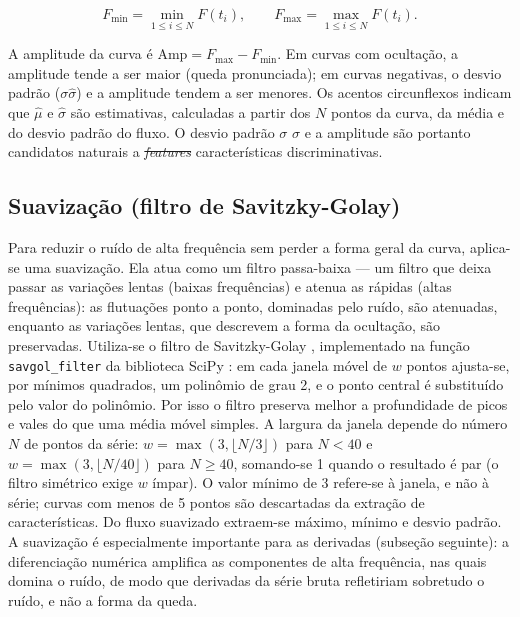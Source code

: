 \documentclass[msc]{on} %
\makeatletter
\providecommand{\DIFaddtex}[1]{{\protect\color{red}#1}} %
\providecommand{\DIFdeltex}[1]{{\protect\color{red}\sout{#1}}} %
\providecommand{\DIFaddbegin}{} %
\providecommand{\DIFaddend}{} %
\providecommand{\DIFdelbegin}{} %
\providecommand{\DIFdelend}{} %
\providecommand{\DIFadd}[1]{\texorpdfstring{\DIFaddtex{#1}}{#1}} %
\providecommand{\DIFdel}[1]{\texorpdfstring{\DIFdeltex{#1}}{}} %
\let\sout@orig\sout %
\renewcommand{\sout}[1]{\ifmmode\text{\sout@orig{\ensuremath{#1}}}\else\sout@orig{#1}\fi} %
\makeatother
\begin{document}
\begin{equation}
F_{\min} = \min_{1 \leq i \leq N} F(t_i), \qquad
F_{\max} = \max_{1 \leq i \leq N} F(t_i).
\end{equation}

A amplitude da curva é \(\mathrm{Amp} = F_{\max} - F_{\min}\). Em curvas com ocultação, a amplitude tende a ser maior (queda pronunciada); em curvas negativas, o desvio padrão (\DIFdelbegin \DIFdel{\(\sigma\)}\DIFdelend\ifhmode\hskip0pt\fi \DIFaddbegin \DIFadd{\(\hat{\sigma}\)}\DIFaddend ) e a amplitude tendem a ser menores. \DIFaddbegin \DIFadd{Os acentos circunflexos indicam que \(\hat{\mu}\) e \(\hat{\sigma}\) são estimativas, calculadas a partir dos \(N\) pontos da curva, da média e do desvio padrão do fluxo. }\DIFaddend O desvio padrão \DIFdelbegin \DIFdel{\(\sigma\) }\DIFdelend\ifhmode\hskip0pt\fi \DIFaddbegin \DIFadd{\(\hat{\sigma}\) }\DIFaddend e a amplitude são portanto candidatos naturais a \DIFdelbegin \textit{\DIFdel{features}} %
\DIFdelend\ifhmode\hskip0pt\fi \DIFaddbegin \DIFadd{características }\DIFaddend discriminativas.

\subsection{Suavização (filtro de Savitzky-Golay)}
\DIFaddbegin \label{sec:suavizacao}
\DIFaddend 

Para reduzir o ruído de alta frequência sem perder a forma geral da curva, aplica-se uma suavização. Ela atua como um filtro passa-baixa --- um filtro que deixa passar as variações lentas (baixas frequências) e atenua as rápidas (altas frequências): as flutuações ponto a ponto, dominadas pelo ruído, são atenuadas, enquanto as variações lentas, que descrevem a forma da ocultação, são preservadas. Utiliza-se o filtro de Savitzky-Golay \citep{SavitzkyGolay1964}, implementado na função \texttt{savgol\_filter} da biblioteca SciPy \citep{SciPy2020}: em cada janela móvel de \(w\) pontos ajusta-se, por mínimos quadrados, um polinômio de grau 2, e o ponto central é substituído pelo valor do polinômio. Por isso o filtro preserva melhor a profundidade de picos e vales do que uma média móvel simples. A largura da janela depende do número \(N\) de pontos da série: \(w = \max(3, \lfloor N/3 \rfloor)\) para \(N < 40\) e \(w = \max(3, \lfloor N/40 \rfloor)\) para \(N \geq 40\), somando-se 1 quando o resultado é par (o filtro simétrico exige \(w\) ímpar). O valor mínimo de 3 refere-se à janela, e não à série; curvas com menos de 5 pontos são descartadas da extração de características. Do fluxo suavizado extraem-se máximo, mínimo e desvio padrão. A suavização é especialmente importante para as derivadas (subseção seguinte): a diferenciação numérica amplifica as componentes de alta frequência, nas quais domina o ruído, de modo que derivadas da série bruta refletiriam sobretudo o ruído, e não a forma da queda.
\end{document}
